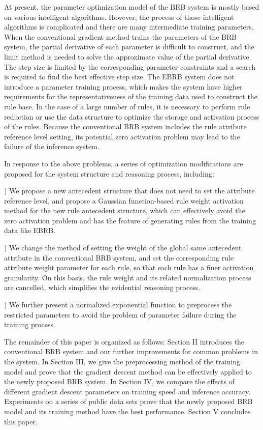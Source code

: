 \documentclass{ieeeaccess}
\begin{document}
At present, the parameter optimization model of the BRB system is mostly based on various intelligent algorithms.
However, the process of those intelligent algorithms is complicated and there are many intermediate training parameters.
When the conventional gradient method trains the parameters of the BRB system, the partial derivative of each parameter is difficult to construct,
and the limit method is needed to solve the approximate value of the partial derivative\cite{a13}.
The step size is limited by the corresponding parameter constraints and a search is required to find the best effective step size\cite{a11,a12,a13}.
The EBRB system does not introduce a parameter training process, which makes the system have higher requirements for the representativeness of the training data used to construct the rule base.
In the case of a large number of rules, it is necessary to perform rule reduction or
use the data structure to optimize the storage and activation process of the rules. Because the conventional BRB system includes the rule attribute
reference level setting, its potential zero activation problem may lead to the failure of the inference system.

In response to the above problems, a series of optimization modifications are proposed for the system structure and reasoning process, including:

) We propose a new antecedent structure that does not need to set the attribute reference level, and propose a Gaussian function-based
rule weight activation method for the new rule antecedent structure, which can effectively avoid the zero activation problem and has the feature of
generating rules from the training data like EBRB.

) We change the method of setting the weight of the global same antecedent attribute in the
conventional BRB system, and set the corresponding rule attribute weight parameter for each rule, so that each rule has a finer activation granularity.
On this basis, the rule weight and its related normalization process are cancelled, which simplifies the evidential reasoning process.

) We further present a normalized exponential function to preprocess the restricted parameters to avoid the problem of
parameter failure during the training process.

The remainder of this paper is organized as follows: Section II introduces the conventional BRB system and our further improvements for common problems in the system.
In Section III, we give the preprocessing method of the training model and prove that the gradient descent method can be effectively applied to the newly proposed BRB system.
In Section IV, we compare the effects of different gradient descent parameters on training speed and inference accuracy. Experiments on a series of public data sets prove that
the newly proposed BRB model and its training method have the best performance. Section V concludes this paper.
\end{document}
